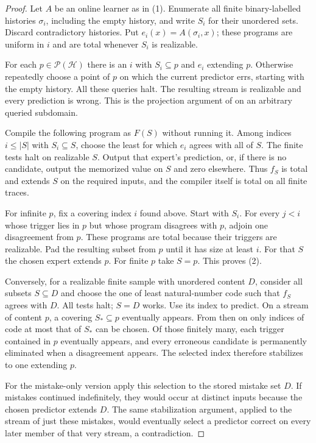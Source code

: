 \documentclass[11pt]{article}
\newcommand{\HH}{\mathcal H}
\begin{document}
\begin{proof}
Let $A$ be an online learner as in (1). Enumerate all finite binary-labelled histories $\sigma_i$, including the empty history, and write $S_i$ for their unordered sets. Discard contradictory histories. Put $e_i(x)=A(\sigma_i,x)$; these programs are uniform in $i$ and are total whenever $S_i$ is realizable.

For each $p\in\mathcal P(\HH)$ there is an $i$ with $S_i\subseteq p$ and $e_i$ extending $p$. Otherwise repeatedly choose a point of $p$ on which the current predictor errs, starting with the empty history. All these queries halt. The resulting stream is realizable and every prediction is wrong. This is the projection argument of \cite[Lemma~3]{ks} on an arbitrary queried subdomain.

Compile the following program as $F(S)$ without running it. Among indices $i\le |S|$ with $S_i\subseteq S$, choose the least for which $e_i$ agrees with all of $S$. The finite tests halt on realizable $S$. Output that expert's prediction, or, if there is no candidate, output the memorized value on $S$ and zero elsewhere. Thus $f_S$ is total and extends $S$ on the required inputs, and the compiler itself is total on all finite traces.

For infinite $p$, fix a covering index $i$ found above. Start with $S_i$. For every $j<i$ whose trigger lies in $p$ but whose program disagrees with $p$, adjoin one disagreement from $p$. These programs are total because their triggers are realizable. Pad the resulting subset from $p$ until it has size at least $i$. For that $S$ the chosen expert extends $p$. For finite $p$ take $S=p$. This proves (2).

Conversely, for a realizable finite sample with unordered content $D$, consider all subsets $S\subseteq D$ and choose the one of least natural-number code such that $f_S$ agrees with $D$. All tests halt; $S=D$ works. Use its index to predict. On a stream of content $p$, a covering $S_*\subseteq p$ eventually appears. From then on only indices of code at most that of $S_*$ can be chosen. Of those finitely many, each trigger contained in $p$ eventually appears, and every erroneous candidate is permanently eliminated when a disagreement appears. The selected index therefore stabilizes to one extending $p$.

For the mistake-only version apply this selection to the stored mistake set $D$. If mistakes continued indefinitely, they would occur at distinct inputs because the chosen predictor extends $D$. The same stabilization argument, applied to the stream of just these mistakes, would eventually select a predictor correct on every later member of that very stream, a contradiction.


\end{proof}
\end{document}
